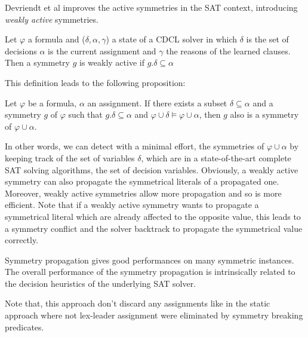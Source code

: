 Devriendt et al improves the active symmetries in the SAT context, introducing \emph{weakly active} symmetries.
\begin{definition}
 \label{def:weakly_active_symmetry}
 Let $\varphi$ a formula and ($\delta, \alpha, \gamma$) a state of a CDCL solver in which $\delta$ is the set of decisions
 $\alpha$ is the current assignment and $\gamma$ the reasons of the learned clauses. Then a symmetry $g$ is weakly active 
 if $g.\delta \subseteq \alpha$
\end{definition}
This definition leads to the following proposition:
\begin{proposition}
 Let $\varphi$ be a formula, $\alpha $ an assignment. If
 there exists a subset $\delta \subseteq \alpha $ and a symmetry $g$ of $\varphi$ such that 
 $g.\delta \subseteq \alpha $ and $\varphi \cup \delta \models \varphi \cup \alpha$, then $g$ 
 also is a symmetry of $\varphi \cup \alpha $.
\end{proposition}


In other words, we can detect with a minimal effort, the symmetries of $\varphi
\cup \alpha$ by keeping track of the set of variables $\delta$, which are 
in a state-of-the-art complete SAT solving algorithms, the set of decision variables.
Obviously, a weakly active symmetry can also propagate the symmetrical literals of a propagated one.
Moreover, weakly active symmetries allow more propagation and so is more efficient.
Note that if a weakly active symmetry wants to propagate a symmetrical literal which are already affected to the 
opposite value, this leads to a symmetry conflict and the solver backtrack to propagate the symmetrical value correctly.


Symmetry propagation gives good performances on many symmetric instances.
The overall performance of the symmetry propagation is intrinsically related to the decision heuristics of the underlying SAT solver.

Note that, this approach don't discard any assignments like in the static approach where 
not lex-leader assignment were eliminated by symmetry breaking predicates.


